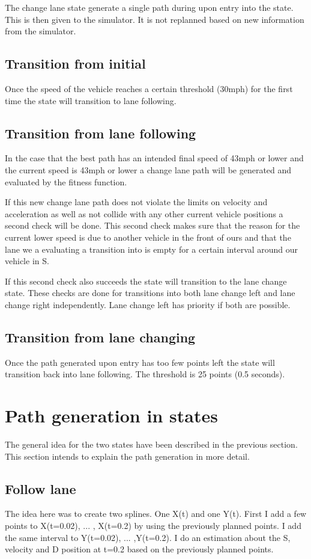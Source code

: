 \documentclass[12pt,a4paper]{article}
\begin{document}
The change lane state generate a single path during upon entry into the state. This is then given to the simulator. It is not replanned based on new information from the simulator.

\subsection{Transition from initial} 
Once the speed of the vehicle reaches a certain threshold (30mph) for the first time the state will transition to lane following.

\subsection{Transition from lane following} 
In the case that the best path has an intended final speed of 43mph or lower and the current speed is 43mph or lower a change lane path will be generated and evaluated by the fitness function. 

If this new change lane path does not violate the limits on velocity and acceleration as well as not collide with any other current vehicle positions a second check will be done. This second check makes sure that the reason for the current lower speed is due to another vehicle in the front of ours and that the lane we a evaluating a transition into is empty for a certain interval around our vehicle in S.

If this second check also succeeds the state will transition to the lane change state. These checks are done for transitions into both lane change left and lane change right independently. Lane change left has priority if both are possible.

\subsection{Transition from lane changing} 
Once the path generated upon entry has too few points left the state will transition back into lane following. The threshold is 25 points (0.5 seconds).

\section{Path generation in states}
The general idea for the two states have been described in the previous section. This section intends to explain the path generation in more detail.

\subsection{Follow lane}
The idea here was to create two splines. One X(t) and one Y(t). First I add a few points to X(t=0.02), ... , X(t=0.2) by using the previously planned points. I add the same interval to Y(t=0.02), ... ,Y(t=0.2). I do an estimation about the S, velocity and D position at t=0.2 based on the previously planned points.
\end{document}

